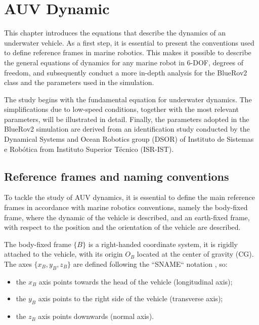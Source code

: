 \chapter{AUV Dynamic}
\label{chap:second}
\ifpdf
    \graphicspath{{Chapter2/Figures/PNG/}{Chapter2/Figures/PDF/}{Chapter2/Figures/}{Chapter2/Figures/EPS/}}
\else
    \graphicspath{{Chapter2/Figures/EPS/}{Chapter2/Figures/}}
\fi
This chapter introduces the equations that describe the dynamics of an underwater vehicle. As a first step, it is essential to present 
the conventions used to define reference frames in marine robotics. This makes it possible to describe the general equations of dynamics 
\cite{fossenHandbookMarineCraft2011} for any marine robot in 6-DOF, degrees of freedom, and subsequently conduct a more in-depth analysis 
for the BlueRov2 class and the parameters used in the simulation.

The study begins with the fundamental equation for underwater dynamics. The simplifications due to low-speed conditions, together with the most relevant 
parameters, will be illustrated in detail.
Finally, the parameters adopted in the BlueRov2 simulation are derived from an identification study conducted by the Dynamical Systems and Ocean Robotics group (DSOR) 
of Instituto de Sistemas e Robótica from Instituto Superior Técnico (ISR-IST).

\section{Reference frames and naming conventions}
To tackle the study of AUV dynamics, it is essential to define the main reference frames in accordance with marine robotics conventions, namely 
the body-fixed frame, where the dynamic of the vehicle is described, and an earth-fixed frame, with respect to the position and the orientation 
of the vehicle are described.

The body-fixed frame $\{B\}$ is a right-handed coordinate system, it is rigidly attached to the vehicle, with its origin $O_B$ located at the 
center of gravity (CG). The axes $\{x_B , y_B , z_B\}$ are defined following the ``SNAME`` notation
 \cite{thesocietyofnavalarchitectsandmarineengineerssnameNomenclatureTreatingMotion1950}, so:
 \begin{itemize}
    \item the $x_B$ axis points towards the head of the vehicle (longitudinal axis);
    \item the $y_B$ axis points to the right side of the vehicle (transverse axis);
    \item the $z_B$ axis points downwards (normal axis).
 \end{itemize}

